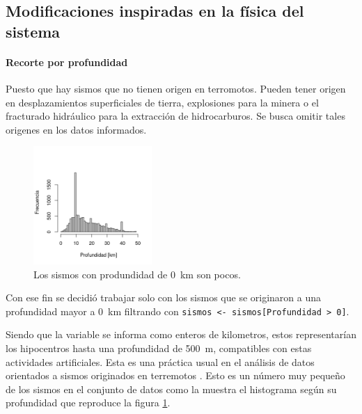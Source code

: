 \documentclass[a4paper]{report}
\begin{document}
\subsection{Modificaciones inspiradas en la física del sistema}


\paragraph{Recorte por profundidad}

Puesto que hay sismos que no tienen origen en terromotos.
Pueden tener origen en desplazamientos superficiales de tierra, explosiones para la minera o el fracturado hidráulico para la extracción de hidrocarburos.
Se busca omitir tales origenes en los datos informados.

\begin{figure}
	\includegraphics[width=0.4\textwidth]{histograma_profundidad_menos50.png}
	\caption{Los sismos con produndidad de \SI{0}{km} son pocos.}
	\label{fig:histograma_profundidad}
\end{figure}
Con ese fin se decidió trabajar solo con los sismos que se originaron a una profundidad mayor a \SI{0}{\kilo\metre} filtrando con \verb'sismos <- sismos[Profundidad > 0]'.

Siendo que la variable se informa como enteros de kilometros, estos representarían los hipocentros hasta una profundidad de \SI{500}{\metre}, compatibles con estas actividades artificiales.
Esta es una práctica usual en el análisis de datos orientados a sismos originados en terremotos \cite{hu_applying_2024}.
Esto es un número muy pequeño de los sismos en el conjunto de datos como la muestra el histograma según su profundidad que reproduce la figura \ref{fig:histograma_profundidad}.
\end{document}
